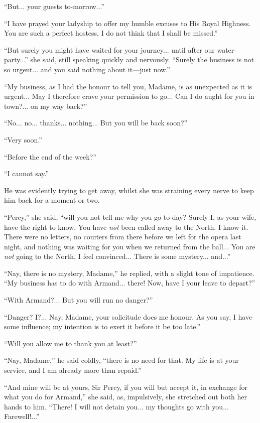 \documentclass[paper=5.5in:8.5in,BCOR=7mm,twoside,DIV=calc,12pt,usegeometry,chapterprefix,endperiod,headings=big]{scrbook}
\begin{document}
\enquote{But... your guests to-morrow...}

\enquote{I have prayed your ladyship to offer my humble excuses to His Royal Highness. You are such a perfect hostess, I do not think that I shall be missed.}

\enquote{But surely you might have waited for your journey... until after our water-party...} she said, still speaking quickly and nervously. \enquote{Surely the business is not so urgent... and you said nothing about it---just now.}

\enquote{My business, as I had the honour to tell you, Madame, is as unexpected as it is urgent... May I therefore crave your permission to go... Can I do aught for you in town?... on my way back?}

\enquote{No... no... thanks... nothing... But you will be back soon?}

\enquote{Very soon.}

\enquote{Before the end of the week?}

\enquote{I cannot say.}

He was evidently trying to get away, whilst she was straining every nerve to keep him back for a moment or two.

\enquote{Percy,} she said, \enquote{will you not tell me why you go to-day? Surely I, as your wife, have the right to know. You have \textit{not} been called away to the North. I know it. There were no letters, no couriers from there before we left for the opera last night, and nothing was waiting for you when we returned from the ball... You are \textit{not} going to the North, I feel convinced... There is some mystery... and...}

\enquote{Nay, there is no mystery, Madame,} he replied, with a slight tone of impatience. \enquote{My business has to do with Armand... there! Now, have I your leave to depart?}

\enquote{With Armand?... But you will run no danger?}

\enquote{Danger? I?... Nay, Madame, your solicitude does me honour. As you say, I have some influence; my intention is to exert it before it be too late.}

\enquote{Will you allow me to thank you at least?}

\enquote{Nay, Madame,} he said coldly, \enquote{there is no need for that. My life is at your service, and I am already more than repaid.}

\enquote{And mine will be at yours, Sir Percy, if you will but accept it, in exchange for what you do for Armand,} she said, as, impulsively, she stretched out both her hands to him. \enquote{There! I will not detain you... my thoughts go with you... Farewell!...}
\end{document}
